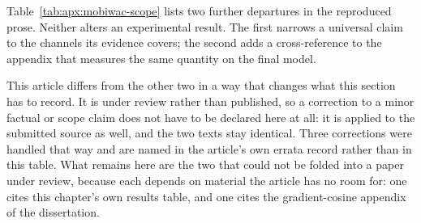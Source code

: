 Table~\ref{tab:apx:mobiwac-scope} lists two further departures in the reproduced prose.
Neither alters an experimental result. The first narrows a universal claim to the channels its
evidence covers; the second adds a cross-reference to the appendix that measures the same quantity
on the final model.

This article differs from the other two in a way that changes what this section has to record.
It is under review rather than published, so a correction to a minor factual or scope claim
does not have to be declared here at all: it is applied to the submitted source as well, and
the two texts stay identical. Three corrections were handled that way and are named in the
article's own errata record rather than in this table. %
What remains here are the two that could
not be folded into a paper under review, because each depends on material the article has no
room for: one cites this chapter's own results table, and one cites the gradient-cosine appendix of the
dissertation.
